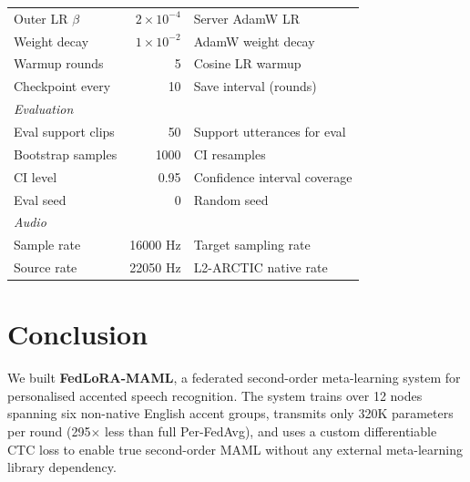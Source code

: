 \documentclass[12pt]{article}
\theoremstyle{plain}
\begin{document}
\begin{table}[H]
\begin{tabular}{p{4.5cm} r p{5.5cm}}
Outer LR $\beta$       & $2\times10^{-4}$ & Server AdamW LR \\
Weight decay           & $1\times10^{-2}$ & AdamW weight decay \\
Warmup rounds          & 5             & Cosine LR warmup \\
Checkpoint every       & 10            & Save interval (rounds) \\
\midrule
\multicolumn{3}{l}{\textit{Evaluation}} \\
Eval support clips     & 50            & Support utterances for eval \\
Bootstrap samples      & 1000          & CI resamples \\
CI level               & 0.95          & Confidence interval coverage \\
Eval seed              & 0             & Random seed \\
\midrule
\multicolumn{3}{l}{\textit{Audio}} \\
Sample rate            & 16000 Hz      & Target sampling rate \\
Source rate            & 22050 Hz      & L2-ARCTIC native rate \\
\bottomrule
\end{tabular}
\end{table}

\section{Conclusion}
\label{sec:conclusion}

We built \textbf{FedLoRA-MAML}, a federated second-order meta-learning system
for personalised accented speech recognition.
The system trains over 12 nodes spanning six non-native English accent groups,
transmits only 320K parameters per round (295$\times$ less than full Per-FedAvg),
and uses a custom differentiable CTC loss to enable true second-order MAML without
any external meta-learning library dependency.
\end{document}
